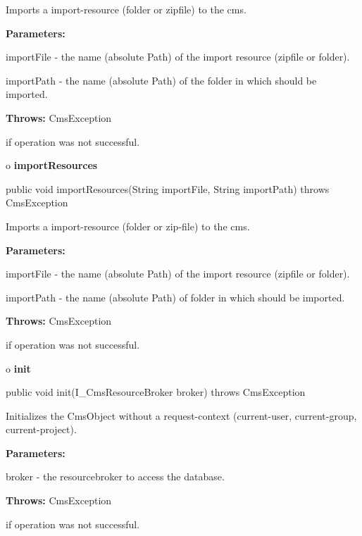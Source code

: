 \begin{description}
\htmlDD Imports a import-resource (folder or zipfile) to the cms. 

\begin{description}
\item {\bf Parameters:}  

importFile - the name (absolute Path) of the import resource (zipfile or
folder).  

importPath - the name (absolute Path) of the folder in which should be
imported.  
\item {\bf Throws:} CmsException  

if operation was not successful.  
\end{description}

\end{description}

o {\bf importResources} 

\begin{PRE}
 public void importResources(String importFile,
                             String importPath) throws CmsException
\end{PRE}

\begin{description}
\htmlDD Imports a import-resource (folder or zip-file) to the cms. 

\begin{description}
\item {\bf Parameters:}  

importFile - the name (absolute Path) of the import resource (zipfile or
folder).  

importPath - the name (absolute Path) of folder in which should be imported.  
\item {\bf Throws:} CmsException  

if operation was not successful.  
\end{description}

\end{description}

o {\bf init} 

\begin{PRE}
 public void init(I\_CmsResourceBroker broker) throws CmsException
\end{PRE}

\begin{description}
\htmlDD Initializes the CmsObject without a request-context (current-user,
current-group, current-project). 

\begin{description}
\item {\bf Parameters:}  

broker - the resourcebroker to access the database.  
\item {\bf Throws:} CmsException  

if operation was not successful.  
\end{description}

\end{description}

